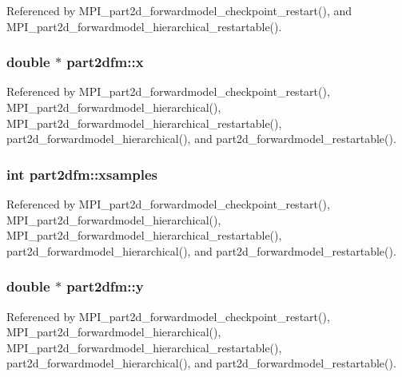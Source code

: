 Referenced by M\+P\+I\+\_\+part2d\+\_\+forwardmodel\+\_\+checkpoint\+\_\+restart(), and M\+P\+I\+\_\+part2d\+\_\+forwardmodel\+\_\+hierarchical\+\_\+restartable().

\subsubsection[{\texorpdfstring{x}{x}}]{\setlength{\rightskip}{0pt plus 5cm}double $\ast$ part2dfm\+::x}\hypertarget{structpart2dfm_a7c8db002ece90497df8ae33cc33e7893}{}\label{structpart2dfm_a7c8db002ece90497df8ae33cc33e7893}


Referenced by M\+P\+I\+\_\+part2d\+\_\+forwardmodel\+\_\+checkpoint\+\_\+restart(), M\+P\+I\+\_\+part2d\+\_\+forwardmodel\+\_\+hierarchical(), M\+P\+I\+\_\+part2d\+\_\+forwardmodel\+\_\+hierarchical\+\_\+restartable(), part2d\+\_\+forwardmodel\+\_\+hierarchical(), and part2d\+\_\+forwardmodel\+\_\+restartable().

\subsubsection[{\texorpdfstring{xsamples}{xsamples}}]{\setlength{\rightskip}{0pt plus 5cm}int part2dfm\+::xsamples}\hypertarget{structpart2dfm_a6ddf3a619abe1c9eba2c8d783661829f}{}\label{structpart2dfm_a6ddf3a619abe1c9eba2c8d783661829f}


Referenced by M\+P\+I\+\_\+part2d\+\_\+forwardmodel\+\_\+checkpoint\+\_\+restart(), M\+P\+I\+\_\+part2d\+\_\+forwardmodel\+\_\+hierarchical(), M\+P\+I\+\_\+part2d\+\_\+forwardmodel\+\_\+hierarchical\+\_\+restartable(), part2d\+\_\+forwardmodel\+\_\+hierarchical(), and part2d\+\_\+forwardmodel\+\_\+restartable().

\subsubsection[{\texorpdfstring{y}{y}}]{\setlength{\rightskip}{0pt plus 5cm}double $\ast$ part2dfm\+::y}\hypertarget{structpart2dfm_a010d561ad03fa50c4b4a15046268fbef}{}\label{structpart2dfm_a010d561ad03fa50c4b4a15046268fbef}


Referenced by M\+P\+I\+\_\+part2d\+\_\+forwardmodel\+\_\+checkpoint\+\_\+restart(), M\+P\+I\+\_\+part2d\+\_\+forwardmodel\+\_\+hierarchical(), M\+P\+I\+\_\+part2d\+\_\+forwardmodel\+\_\+hierarchical\+\_\+restartable(), part2d\+\_\+forwardmodel\+\_\+hierarchical(), and part2d\+\_\+forwardmodel\+\_\+restartable().

